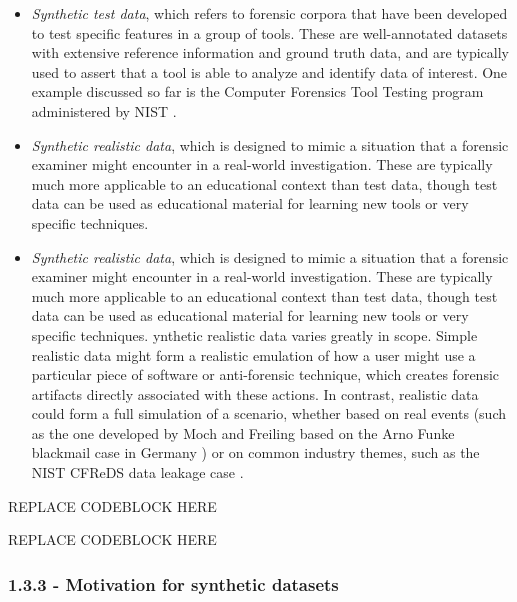 \begin{itemize}
\item
  \emph{Synthetic test data}, which refers to forensic corpora that have
  been developed to test specific features in a group of tools. These
  are well-annotated datasets with extensive reference information and
  ground truth data, and are typically used to assert that a tool is
  able to analyze and identify data of interest. One example discussed
  so far is the Computer Forensics Tool Testing program administered by
  NIST
  \cite{nationalinstituteofstandardsandtechnologyComputerForensicsTool2017}.
\item
  \emph{Synthetic realistic data}, which is designed to mimic a
  situation that a forensic examiner might encounter in a real-world
  investigation. These are typically much more applicable to an
  educational context than test data, though test data can be used as
  educational material for learning new tools or very specific
  techniques.
\item
  \emph{Synthetic realistic data}, which is designed to mimic a
  situation that a forensic examiner might encounter in a real-world
  investigation. These are typically much more applicable to an
  educational context than test data, though test data can be used as
  educational material for learning new tools or very specific
  techniques. ynthetic realistic data varies greatly in scope. Simple
  realistic data might form a realistic emulation of how a user might
  use a particular piece of software or anti-forensic technique, which
  creates forensic artifacts directly associated with these actions. In
  contrast, realistic data could form a full simulation of a scenario,
  whether based on real events (such as the one developed by Moch and
  Freiling based on the Arno Funke blackmail case in Germany
  \cite{mochForensicImageGenerator2009}) or on common industry
  themes, such as the NIST CFReDS data leakage case
  \cite{nationalinstituteofstandardsandtechnologyCFReDSDataLeakage}.
\end{itemize}

REPLACE CODEBLOCK HERE

REPLACE CODEBLOCK HERE

\subsubsection{1.3.3 - Motivation for synthetic
datasets}\label{motivation-for-synthetic-datasets}

